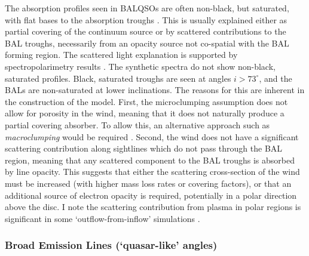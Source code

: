 The absorption profiles seen in BALQSOs are often non-black, but saturated, 
with flat bases to the absorption troughs 
\citep{arav1999b,arav1999a}.
This is usually explained either as  partial covering of the continuum
source or by scattered contributions to the BAL troughs, necessarily
from an opacity source not co-spatial with the BAL forming region.
The scattered light explanation is supported by spectropolarimetry results
\citep{lamy2000}. The synthetic spectra do not show non-black, saturated profiles.
Black, saturated troughs are seen at angles $i > 73^\circ$, and the BALs
are non-saturated at lower inclinations. The reasons for this are inherent 
in the construction of the model. 
First, the microclumping assumption does not allow for 
porosity in the wind, meaning that it does not naturally produce
a partial covering absorber. To allow this, an alternative approach
such as {\em macroclumping} would be required \citep[e.g.][]{hamann2008,surlan2012}.
Second, the wind does not have a significant scattering contribution 
along sightlines which do not pass through the BAL region,
meaning that any scattered component to the BAL troughs is absorbed by line opacity.
This suggests that either the scattering cross-section of the wind must
be increased (with higher mass loss rates or covering factors), or 
that an additional source of electron opacity is required, potentially
in a polar direction above the disc. I note the scattering contribution
from plasma in polar regions is significant in some `outflow-from-inflow'
simulations \citep{KP09, simproga2012}.

\subsubsection{Broad Emission Lines (`quasar-like' angles)}

